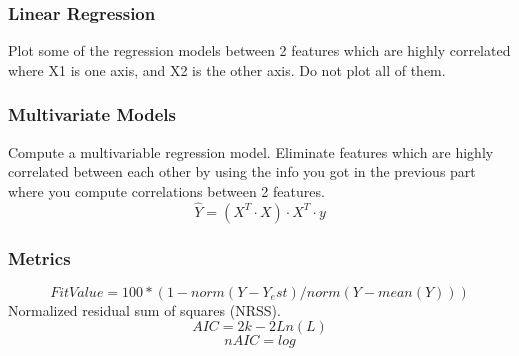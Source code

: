 \documentclass{article}
\begin{document}
\subsubsection{Linear Regression}
Plot some of the regression models between 2 features which are highly correlated where X1 is one axis, and X2 is the other axis. Do not plot all of them.
\subsubsection{Multivariate Models}
Compute a multivariable regression model.
Eliminate features which are highly correlated between each other by using the info you got in the previous part where you compute correlations between 2 features.
$$ \hat{Y} = (X^T \cdot X) \cdot X^T \cdot y $$
\subsubsection{Metrics}
$$ FitValue = 100 * (1-norm(Y-Y_est)/norm(Y-mean(Y))) $$
Normalized residual sum of squares (NRSS).
$$ AIC = 2k - 2Ln(L) $$  
$$ nAIC = log $$
\end{document}
